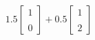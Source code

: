 \documentclass[preview]{standalone}
\begin{document}
\begin{align*}
1.5 \begin{bmatrix} 1 \\ \\ 0 \end{bmatrix} + 0.5 \begin{bmatrix} 1 \\ \\ 2 \end{bmatrix}
\end{align*}
\end{document}
